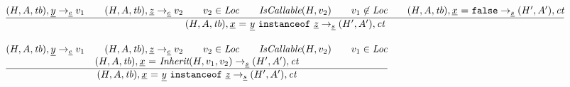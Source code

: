 \documentclass[a4paper, leqno]{amsart}
\newcommand{\rulesep}{\quad\quad}
\newcommand{\stmt}{s}
\newcommand{\expr}{e}
\newcommand{\ir}[1]{\ensuremath{\underline{#1}}}
\newcommand{\irid}{\ir{x}}
\newcommand{\false}{{\tt false}}
\newcommand{\tb}{\emph{tb}}
\newcommand{\Loc}{\emph{Loc}}
\newcommand{\ct}{\emph{ct}}
\newcommand{\hf}[1]{\emph{#1}}
\newcommand{\state}{\ensuremath{(H,A,\tb)}}
\newcommand{\resp}{\ensuremath{(H',A')}}
\newcommand{\evale}{\ensuremath{(H,A,\tb)}}
\begin{document}
\[\begin{array}{l@{~~}l@{~~}ll}
\frac{\begin{matrix}
\evale, \ir{y} \rightarrow_{\ir\expr} v_1
\rulesep
\evale, \ir{z} \rightarrow_{\ir\expr} v_2
\rulesep
v_2 \in \Loc
\rulesep
\hf{IsCallable}(H,v_2)
\rulesep
v_1 \not\in \Loc
\rulesep
\state, \irid \ {\tt =} \ \false \rightarrow_{\ir\stmt} \resp,\ct
\end{matrix}}{\begin{matrix}
\state, \irid \ {\tt =} \ \ir{y} \ {\tt instanceof}\ \ir{z}
\rightarrow_{\ir\stmt}
\resp,\ct
\end{matrix}}
\\[2em]

\frac{\begin{matrix}
\evale, \ir{y} \rightarrow_{\ir\expr} v_1
\rulesep
\evale, \ir{z} \rightarrow_{\ir\expr} v_2
\rulesep
v_2 \in \Loc
\rulesep
\hf{IsCallable}(H,v_2)
\rulesep
v_1 \in \Loc
\\
\state, \irid \ {\tt =} \ \hf{Inherit}(H,v_1,v_2) \rightarrow_{\ir\stmt} \resp,\ct
\end{matrix}}{\begin{matrix}
\state, \irid \ {\tt =} \ \ir{y} \ {\tt instanceof}\ \ir{z}
\rightarrow_{\ir\stmt}
\resp,\ct
\end{matrix}}
\\[2em]

\end{array}
\]
\end{document}
